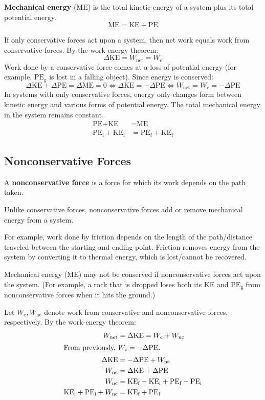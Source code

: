 \documentclass{article}
\newcommand{\definition}[1]{\begin{tcolorbox}[colback=red!5!white,colframe=red!75!black,parbox=false] #1 \end{tcolorbox}}
\begin{document}
\definition{\textbf{Mechanical energy} ($\text{ME}$) is the total kinetic energy of a system plus its total potential energy.
\begin{equation*}
	\text{ME}=\text{KE}+\text{PE}
\end{equation*}}
If only conservative forces act upon a system, then net work equals work from conservative forces. By the work-energy theorem:
\begin{equation*}
	\Delta \text{KE}=W_{\text{net}}=W_{\text{c}}
\end{equation*}
Work done by a conservative force comes at a loss of potential energy (for example, $\text{PE}_\text{g}$ is lost in a falling object). Since energy is conserved:
\begin{equation*}
	\Delta \text{KE}+\Delta \text{PE}=\Delta \text{ME}=0
	\iff \Delta \text{KE}=-\Delta \text{PE}
	\iff W_\text{net}=W_\text{c}=-\Delta \text{PE}
\end{equation*}
In systems with only conservative forces, energy only changes form between kinetic energy and various forms of potential energy. The total mechanical energy in the system remains constant.
\begin{align*}
	\text{PE}+\text{KE}&=\text{ME} \\
	\text{PE}_\text{i}+\text{KE}_\text{i}&=\text{PE}_\text{f}+\text{KE}_\text{f}
\end{align*}

\subsection{Nonconservative Forces}

\definition{A \textbf{nonconservative force} is a force for which its work depends on the path taken.}

Unlike conservative forces, nonconservative forces add or remove mechanical energy from a system.

For example, work done by friction depends on the length of the path/distance traveled between the starting and ending point. Friction removes energy from the system by converting it to thermal energy, which is lost/cannot be recovered.

Mechanical energy (ME) may not be conserved if nonconservative forces act upon the system. (For example, a rock that is dropped loses both its KE and $\text{PE}_\text{g}$ from nonconservative forces when it hits the ground.)

Let $W_{\text{c}},W_{\text{nc}}$ denote work from conservative and nonconservative forces, respectively. By the work-energy theorem:
\begin{align*}
	W_{\text{net}}
	&=\Delta \text{KE}
	=W_{\text{c}}+W_{\text{nc}} \\
	\intertext{From previously, $W_\text{c}=-\Delta \text{PE}$.}
	\Delta \text{KE}
	&=-\Delta \text{PE}+W_\text{nc} \\
	W_\text{nc}
	&=\Delta \text{KE}+\Delta \text{PE} \\
	W_\text{nc}
	&=\text{KE}_\text{f}-\text{KE}_\text{i}+\text{PE}_\text{f}-\text{PE}_\text{i} \\
	\text{KE}_\text{i}+\text{PE}_\text{i}+W_\text{nc}
	&=\text{KE}_\text{f}+\text{PE}_\text{f}
\end{align*}
\end{document}
